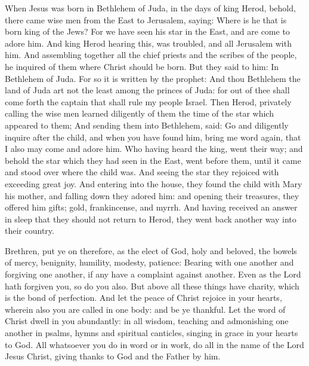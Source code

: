 \begin{multicols}{2}
When Jesus was born in Bethlehem of Juda, in the days of king Herod,
behold, there came wise men from the East to Jerusalem, saying: Where is he
that is born king of the Jews? For we have seen his star in the East, and are
come to adore him.  And king Herod hearing this, was troubled, and all
Jerusalem with him.  And assembling together all the chief priests and the
scribes of the people, he inquired of them where Christ should be born.  But
they said to him: In Bethlehem of Juda. For so it is written by the prophet:
And thou Bethlehem the land of Juda art not the least among the princes of
Juda: for out of thee shall come forth the captain that shall rule my people
Israel.  Then Herod, privately calling the wise men learned diligently of them
the time of the star which appeared to them; And sending them into Bethlehem,
said: Go and diligently inquire after the child, and when you have found him,
bring me word again, that I also may come and adore him.  Who having heard the
king, went their way; and behold the star which they had seen in the East, went
before them, until it came and stood over where the child was.  And seeing the
star they rejoiced with exceeding great joy.  And entering into the house, they
found the child with Mary his mother, and falling down they adored him: and
opening their treasures, they offered him gifts; gold, frankincense, and myrrh.
And having received an answer in sleep that they should not return to Herod,
they went back another way into their country.


\bigskip



Brethren, put ye on therefore, as the elect of God, holy and beloved, the bowels of
mercy, benignity, humility, modesty, patience: Bearing with one another and
forgiving one another, if any have a complaint against another. Even as the
Lord hath forgiven you, so do you also.  But above all these things have
charity, which is the bond of perfection.  And let the peace of Christ rejoice
in your hearts, wherein also you are called in one body: and be ye thankful.
Let the word of Christ dwell in you abundantly: in all wisdom, teaching and
admonishing one another in psalms, hymns and spiritual canticles, singing in
grace in your hearts to God.  All whatsoever you do in word or in work, do all
in the name of the Lord Jesus Christ, giving thanks to God and the Father by
him.




\end{multicols}
